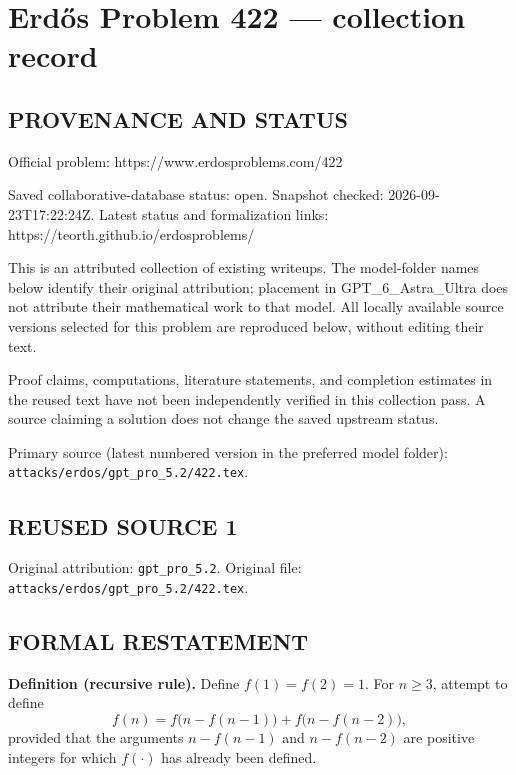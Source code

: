 \section*{Erd\H{o}s Problem 422 --- collection record}

\subsection*{PROVENANCE AND STATUS}
Official problem: https://www.erdosproblems.com/422

Saved collaborative-database status: open.
Snapshot checked: 2026-09-23T17:22:24Z.
Latest status and formalization links: https://teorth.github.io/erdosproblems/

This is an attributed collection of existing writeups. The model-folder names below identify their original attribution; placement in GPT\_6\_Astra\_Ultra does not attribute their mathematical work to that model. All locally available source versions selected for this problem are reproduced below, without editing their text.

Proof claims, computations, literature statements, and completion estimates in the reused text have not been independently verified in this collection pass. A source claiming a solution does not change the saved upstream status.

Primary source (latest numbered version in the preferred model folder): \texttt{attacks/erdos/gpt\_pro\_5.2/422.tex}.

\subsection*{REUSED SOURCE 1}
Original attribution: \texttt{gpt\_pro\_5.2}.
Original file: \texttt{attacks/erdos/gpt\_pro\_5.2/422.tex}.


\subsection*{FORMAL RESTATEMENT}
\textbf{Definition (recursive rule).} Define $f(1)=f(2)=1$. For $n\ge 3$, attempt to define
\[
 f(n) = f\big(n-f(n-1)\big)+f\big(n-f(n-2)\big),
\]
provided that the arguments $n-f(n-1)$ and $n-f(n-2)$ are positive integers for which $f(\cdot)$ has already been defined.

